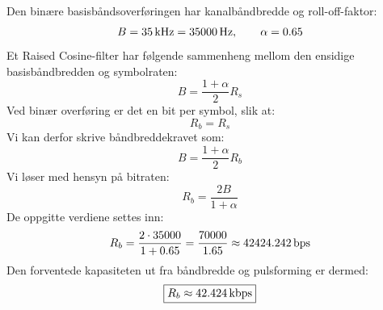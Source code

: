 Den binære basisbåndsoverføringen har kanalbåndbredde og roll-off-faktor:
\[
    B=35\,\mathrm{kHz}=35000\,\mathrm{Hz},\qquad\alpha=0.65
\]
Et Raised Cosine-filter har følgende sammenheng mellom den ensidige basisbåndbredden og symbolraten:
\[
    B=\frac{1+\alpha}{2}R_s
\]
Ved binær overføring er det en bit per symbol, slik at:
\[
    R_b=R_s
\]
Vi kan derfor skrive båndbreddekravet som:
\[
    B=\frac{1+\alpha}{2}R_b
\]
Vi løser med hensyn på bitraten:
\[
    R_b=\frac{2B}{1+\alpha}
\]
De oppgitte verdiene settes inn:
\[
    R_b=\frac{2\cdot35000}{1+0.65}
       =\frac{70000}{1.65}
       \approx42424.242\,\mathrm{bps}
\]
Den forventede kapasiteten ut fra båndbredde og pulsforming er dermed:
\[
    \boxed{R_b\approx42.424\,\mathrm{kbps}}
\]
